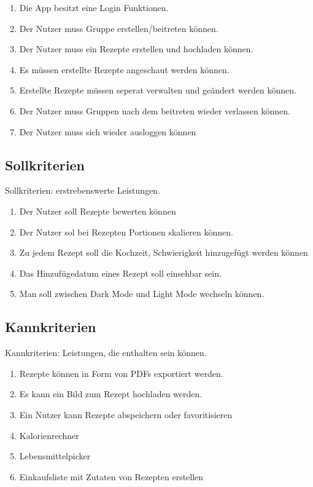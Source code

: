 \documentclass[parskip=full]{scrartcl}
\begin{document}
\begin{enumerate}[start=1,label={$\langle$\bfseries RM\arabic*$\rangle$}, leftmargin = 5em, itemsep=4pt, parsep=4pt]
    \item Die App besitzt eine Login Funktionen.
    \item Der Nutzer muss Gruppe erstellen/beitreten können.
    \item Der Nutzer muss ein Rezepte erstellen und hochladen können.
    \item Es müssen erstellte Rezepte angeschaut werden können.
    \item Erstellte Rezepte müssen seperat verwalten und geändert werden können.
    \item Der Nutzer muss Gruppen nach dem beitreten wieder verlassen können.
    \item Der Nutzer muss sich wieder ausloggen können
\end{enumerate}

\subsection{Sollkriterien}
Sollkriterien: erstrebenswerte Leistungen.

\begin{enumerate}[start=1,label={$\langle$\bfseries RS\arabic*$\rangle$}, leftmargin = 5em, itemsep=4pt, parsep=4pt]
    \item Der Nutzer soll Rezepte bewerten können
    \item Der Nutzer sol bei Rezepten Portionen skalieren können.
    \item Zu jedem Rezept soll die Kochzeit, Schwierigkeit hinzugefügt werden können
    \item Das Hinzufügedatum eines Rezept soll einsehbar sein.
    \item Man soll zwischen Dark Mode und Light Mode wechseln können.
\end{enumerate}

\subsection{Kannkriterien}
Kannkriterien: Leistungen, die enthalten sein können.

\begin{enumerate}[start=1,label={$\langle$\bfseries RC\arabic*$\rangle$}, leftmargin = 5em, itemsep=4pt, parsep=4pt]
    \item Rezepte können in Form von PDFs exportiert werden.
    \item Es kann ein Bild zum Rezept hochladen werden.
    \item Ein Nutzer kann Rezepte abspeichern oder favoritisieren
    \item Kalorienrechner
    \item Lebensmittelpicker
    \item Einkaufsliste mit Zutaten von Rezepten erstellen
\end{enumerate}
\end{document}
